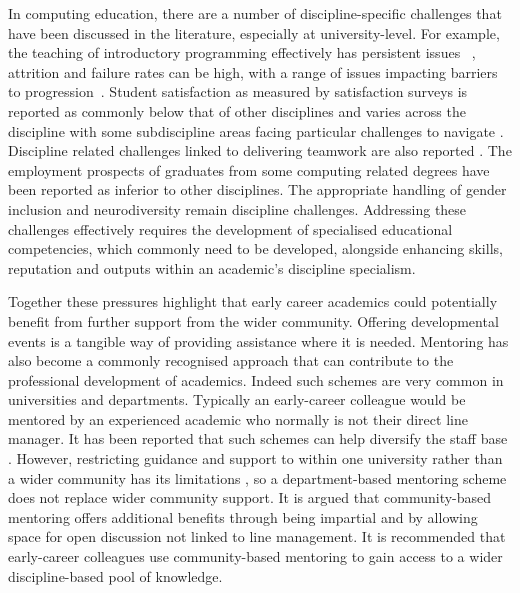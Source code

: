 \documentclass[sigconf]{acmart}
\begin{document}
In computing education, there are a number of discipline-specific
challenges that have been discussed in the literature, especially at
university-level. For example, the teaching of introductory
programming effectively has persistent issues
~\cite{davenport-et-al:latice2016,murphy-et-al:programming2017,simon-et-al:sigcse2018},
attrition and failure rates can be high, with a range of issues
impacting barriers to
progression~\cite{Watson:2014:FRI:2591708.2591749}. Student
satisfaction as measured by satisfaction surveys is reported as
commonly below that of other disciplines \cite{Sinclair2015} and
varies across the discipline with some subdiscipline areas facing
particular challenges to navigate \cite{Knutas2021}. Discipline
related challenges linked to delivering teamwork are also reported
\cite{Gordon2010,Phillips2021}. The employment prospects of graduates
from some computing related degrees have been reported as inferior to
other disciplines\cite{shadbolt2016shadbolt}. The appropriate handling
of gender inclusion \cite{Winter2021} and neurodiversity
\cite{Stuurman2109} remain discipline challenges. Addressing these
challenges effectively requires the development of specialised
educational competencies, which commonly need to be developed,
alongside enhancing skills, reputation and outputs within an
academic’s discipline specialism.

Together these pressures highlight that early career academics could
potentially benefit from further support from the wider
community. Offering developmental events is a tangible way of
providing assistance where it is needed. Mentoring has also become a
commonly recognised approach that can contribute to the professional development of
academics. Indeed such schemes are very common in universities and
departments. Typically an early-career colleague would be mentored by
an experienced academic who normally is not their direct line
manager. It has been reported that such schemes can help diversify the
staff base \cite{Golubchik2018}. However, restricting guidance and
support to within one university rather than a wider community has its
limitations \cite{Golubchik2018}, so a department-based mentoring
scheme does not replace wider community support.  It is argued that
community-based mentoring offers additional benefits through being
impartial and by allowing space for open discussion not linked to line
management. It is recommended that early-career colleagues use
community-based mentoring to gain access to a wider discipline-based
pool of knowledge.
\end{document}
